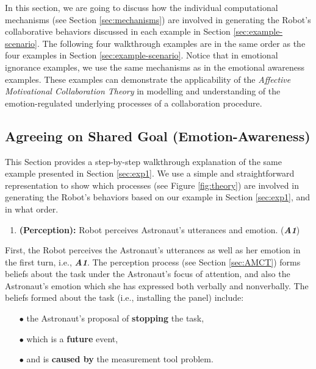 In this section, we are going to discuss how the individual computational
mechanisms (see Section \ref{sec:mechanisms}) are involved in generating the
Robot's collaborative behaviors discussed in each example in Section
\ref{sec:example-scenario}. The following four walkthrough examples are in the
same order as the four examples in Section \ref{sec:example-scenario}. Notice
that in emotional ignorance examples, we use the same mechanisms as in the
emotional awareness examples. These examples can demonstrate the
applicability of the \textit{Affective Motivational Collaboration Theory} in
modelling and understanding of the emotion-regulated underlying processes of a
collaboration procedure.

\subsection{Agreeing on Shared Goal (Emotion-Awareness)}
\label{sec:wt-exp1}

This Section provides a step-by-step walkthrough explanation of the same
example presented in Section \ref{sec:exp1}. We use a simple and straightforward
representation to show which processes (see Figure \ref{fig:theory}) are
involved in generating the Robot's behaviors based on our example in Section
\ref{sec:exp1}, and in what order.

\begin{enumerate}
  \item \textbf{(Perception):} Robot perceives Astronaut's utterances and
  emotion.
  (\textit{\textbf{A1}})
\end{enumerate}
  
First, the Robot perceives the Astronaut's utterances as well as her emotion in
the first turn, i.e., \textit{\textbf{A1}}. The perception process (see Section
\ref{sec:AMCT}) forms beliefs about the task under the Astronaut's focus of
attention, and also the Astronaut's emotion which she has expressed both
verbally and nonverbally. The beliefs formed about the task (i.e., installing
the panel) include:

\begin{itemize}
  \item[$\bullet$] the Astronaut's proposal of \textbf{stopping} the task,
  \item[$\bullet$] which is a \textbf{future} event,
  \item[$\bullet$] and is \textbf{caused by} the measurement tool problem.
\end{itemize}

